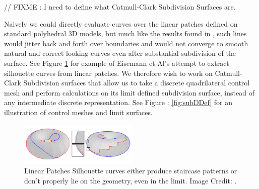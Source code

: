 \documentclass[12pt, letterpaper]{article}
\begin{document}
	
	// FIXME : I need to define what Catmull-Clark Subdivision Surfaces are.

		Naively we could directly evaluate curves over the linear patches defined on standard polyhedral 3D models,
		but much like the results found in \cite{Eisemann08},
		such lines would jitter back and forth over boundaries and would not converge to smooth natural and correct looking curves even after substantial
		subdivision of the surface. See Figure \ref{fig:Eisemann_linear_patches} for example of Eisemann et Al's attempt to extract silhouette
		curves from linear patches. We therefore wish to work on Catmull-Clark Subdivision surfaces that allow us to take a discrete quadrilateral control mesh
		and perform calculations on its limit defined subdivision surface, instead of any intermediate discrete representation.
		See Figure : \ref{fig:subDDef} for an illustration of control meshes and limit surfaces.

		\begin{figure}[h]
		\centering
		\includegraphics[width=0.5\textwidth]{Eisemann08_linear_patches}
		\caption{Linear Patches Silhouette curves either produce staircase patterns or don't properly lie on the geometry, even in the limit. Image Credit: \cite{Eisemann08}.}
		\label{fig:Eisemann_linear_patches}
		\end{figure}
\end{document}
